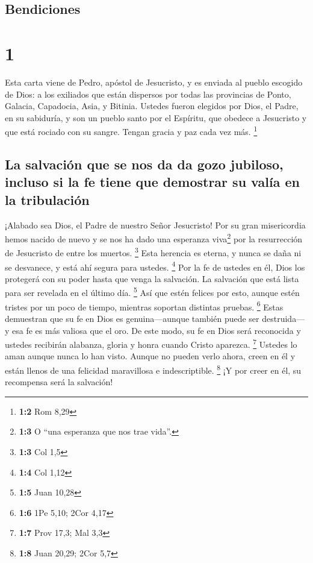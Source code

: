 \hypertarget{bendiciones}{%
\subsection{Bendiciones}\label{bendiciones}}

\hypertarget{section}{%
\section{1}\label{section}}

 Esta carta viene de Pedro, apóstol de Jesucristo, y es
enviada al pueblo escogido de Dios: a los exiliados que están dispersos
por todas las provincias de Ponto, Galacia, Capadocia, Asia, y Bitinia.
 Ustedes fueron elegidos por Dios, el Padre, en su
sabiduría, y son un pueblo santo por el Espíritu, que obedece a
Jesucristo y que está rociado con su sangre. Tengan gracia y paz cada
vez más. \footnote{\textbf{1:2} Rom 8,29}

\hypertarget{la-salvaciuxf3n-que-se-nos-da-da-gozo-jubiloso-incluso-si-la-fe-tiene-que-demostrar-su-valuxeda-en-la-tribulaciuxf3n}{%
\subsection{La salvación que se nos da da gozo jubiloso, incluso si la
fe tiene que demostrar su valía en la
tribulación}\label{la-salvaciuxf3n-que-se-nos-da-da-gozo-jubiloso-incluso-si-la-fe-tiene-que-demostrar-su-valuxeda-en-la-tribulaciuxf3n}}

 ¡Alabado sea Dios, el Padre de nuestro Señor Jesucristo!
Por su gran misericordia hemos nacido de nuevo y se nos ha dado una
esperanza viva\footnote{\textbf{1:3} O ``una esperanza que nos trae
  vida''.} por la resurrección de Jesucristo de entre los muertos.
\footnote{\textbf{1:3} Col 1,5}  Esta herencia es eterna,
y nunca se daña ni se desvanece, y está ahí segura para ustedes.
\footnote{\textbf{1:4} Col 1,12}  Por la fe de ustedes en
él, Dios los protegerá con su poder hasta que venga la salvación. La
salvación que está lista para ser revelada en el último día. \footnote{\textbf{1:5}
  Juan 10,28}  Así que estén felices por esto, aunque
estén tristes por un poco de tiempo, mientras soportan distintas
pruebas. \footnote{\textbf{1:6} 1Pe 5,10; 2Cor 4,17} 
Estas demuestran que su fe en Dios es genuina---aunque también puede ser
destruida---y esa fe es más valiosa que el oro. De este modo, su fe en
Dios será reconocida y ustedes recibirán alabanza, gloria y honra cuando
Cristo aparezca. \footnote{\textbf{1:7} Prov 17,3; Mal 3,3}
 Ustedes lo aman aunque nunca lo han visto. Aunque no
pueden verlo ahora, creen en él y están llenos de una felicidad
maravillosa e indescriptible. \footnote{\textbf{1:8} Juan 20,29; 2Cor
  5,7}  ¡Y por creer en él, su recompensa será la
salvación!


